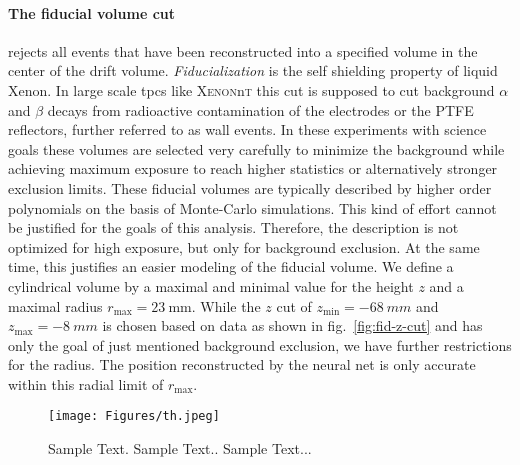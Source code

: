 \paragraph{The fiducial volume cut} rejects all events that have been reconstructed into a specified volume in the center of the drift volume.
\emph{Fiducialization} is the self shielding property of liquid Xenon.
In large scale \gls{tpc}s like \textsc{Xenon}n\textsc{t} this cut is supposed to cut background $\alpha$ and $\beta$ decays from radioactive contamination of the electrodes or the PTFE reflectors, further referred to as wall events.
In these experiments with science goals these volumes are selected very carefully to minimize the background while achieving maximum exposure to reach higher statistics or alternatively stronger exclusion limits.
These fiducial volumes are typically described by higher order polynomials on the basis of Monte-Carlo simulations. %
This kind of effort cannot be justified for the goals of this analysis.
Therefore, the description is not optimized for high exposure, but only for background exclusion.
At the same time, this justifies an easier modeling of the fiducial volume.
We define a cylindrical volume by a maximal and minimal value for the height $z$ and a maximal radius $r_\mathrm{max} = \SI{23}{\milli\m}$.
While the $z$ cut of $z_\mathrm{min}= \SI{-68}{mm}$ and $z_\mathrm{max}= \SI{-8}{mm}$ is chosen based on data as shown in fig.~\ref{fig:fid-z-cut} and has only the goal of just mentioned background exclusion, we have further restrictions for the radius.
The position reconstructed by the neural net is only accurate within this radial limit of $r_\mathrm{max}$\cite{ABism}.


\begin{figure}[H]
\centering
\texttt{[image: Figures/th.jpeg]}  %
\caption[Area-Width Histogram smaller S1 after Fid. Cut]{
        Sample Text.
        Sample Text..
        Sample Text...
    }
\label{fig:other_s1_area_width}
\end{figure}


